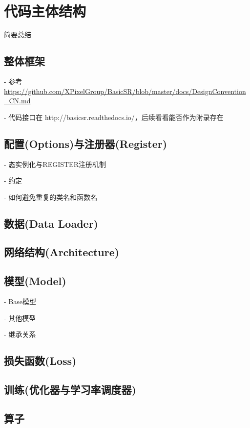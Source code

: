 \documentclass[../main.tex]{subfiles}
\begin{document}
\chapter{代码主体结构}
\vspace{-2cm}

简要总结

\section{整体框架}

- 参考 \url{https://github.com/XPixelGroup/BasicSR/blob/master/docs/DesignConvention_CN.md}

- 代码接口在 http://basicsr.readthedocs.io/，后续看看能否作为附录存在

\section{配置(Options)与注册器(Register)}

- 态实例化与REGISTER注册机制

- 约定

- 如何避免重复的类名和函数名


\section{数据(Data Loader)}

\section{网络结构(Architecture)}

\section{模型(Model)}

- Base模型

- 其他模型

- 继承关系

\section{损失函数(Loss)}

\section{训练(优化器与学习率调度器)}

\section{算子}
\end{document}

